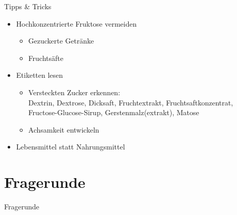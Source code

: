 \documentclass[xcolor=dvipsnames]{beamer}
\begin{document}
    \begin{frame}{Tipps \& Tricks}
        \begin{itemize}
            \setlength\itemsep{1em}
            \item Hochkonzentrierte Fruktose vermeiden
            \begin{itemize}
                \item Gezuckerte Getränke
                \item Fruchtsäfte
            \end{itemize}
            \item Etiketten lesen
            \begin{itemize}
                \item Versteckten Zucker erkennen:\\ Dextrin, Dextrose, Dicksaft, Fruchtextrakt, Fruchtsaftkonzentrat, Fructose-Glucose-Sirup, Gerstenmalz(extrakt), Matose
                \item Achsamkeit entwickeln
            \end{itemize}
            \item Lebensmittel statt Nahrungsmittel
        \end{itemize}
    \end{frame}

    \section{Fragerunde}
    {
        \begin{frame}
            \begin{center}
                \Huge Fragerunde
            \end{center}
        \end{frame}
    }
\end{document}
